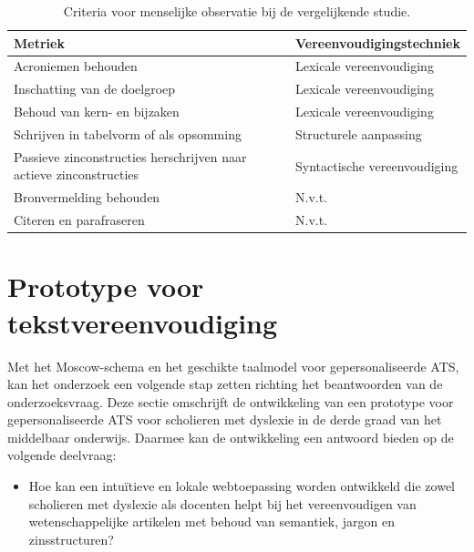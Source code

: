 \begin{table}[H]
	\begin{tabular}{| m{6cm} | m{6cm} |}
		\hline
		\textbf{Metriek} & \textbf{Vereenvoudigingstechniek} \\ \hline
		Acroniemen behouden & Lexicale vereenvoudiging 	\\ \hline
		Inschatting van de doelgroep & Lexicale vereenvoudiging	\\ \hline
		Behoud van kern- en bijzaken & Lexicale vereenvoudiging \\ \hline
		Schrijven in tabelvorm of als opsomming & Structurele aanpassing \\ \hline
		Passieve zinconstructies herschrijven naar actieve zinconstructies & Syntactische vereenvoudiging \\ \hline
		Bronvermelding behouden &  N.v.t. \\ \hline
		Citeren en parafraseren & N.v.t. \\ \hline
	\end{tabular}
	\caption{Criteria voor menselijke observatie bij de vergelijkende studie.}
	\label{table:criteria-vergelijkende-studie-human-obv}
\end{table}

\section{Prototype voor tekstvereenvoudiging}

Met het Moscow-schema en het geschikte taalmodel voor gepersonaliseerde ATS, kan het onderzoek een volgende stap zetten richting het beantwoorden van de onderzoeksvraag. Deze sectie omschrijft de ontwikkeling van een prototype voor gepersonaliseerde ATS voor scholieren met dyslexie in de derde graad van het middelbaar onderwijs. Daarmee kan de ontwikkeling een antwoord bieden op de volgende deelvraag: 

\begin{itemize}
	\item Hoe kan een intuïtieve en lokale webtoepassing worden ontwikkeld die zowel scholieren met dyslexie als docenten helpt bij het vereenvoudigen van wetenschappelijke artikelen met behoud van semantiek, jargon en zinsstructuren?
\end{itemize}

